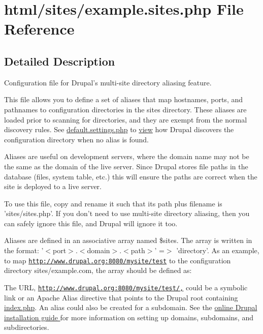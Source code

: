 \hypertarget{example_8sites_8php}{
\section{html/sites/example.sites.php File Reference}
\label{example_8sites_8php}
}


\subsection{Detailed Description}
Configuration file for Drupal's multi-\/site directory aliasing feature.

This file allows you to define a set of aliases that map hostnames, ports, and pathnames to configuration directories in the sites directory. These aliases are loaded prior to scanning for directories, and they are exempt from the normal discovery rules. See \hyperlink{default_8settings_8php}{default.settings.php} to \hyperlink{classview}{view} how Drupal discovers the configuration directory when no alias is found.

Aliases are useful on development servers, where the domain name may not be the same as the domain of the live server. Since Drupal stores file paths in the database (files, system table, etc.) this will ensure the paths are correct when the site is deployed to a live server.

To use this file, copy and rename it such that its path plus filename is 'sites/sites.php'. If you don't need to use multi-\/site directory aliasing, then you can safely ignore this file, and Drupal will ignore it too.

Aliases are defined in an associative array named \$sites. The array is written in the format: '$<$port$>$.$<$domain$>$.$<$path$>$' =$>$ 'directory'. As an example, to map \href{http://www.drupal.org:8080/mysite/test}{\tt http://www.drupal.org:8080/mysite/test} to the configuration directory sites/example.com, the array should be defined as: 
 The URL, \href{http://www.drupal.org:8080/mysite/test/,}{\tt http://www.drupal.org:8080/mysite/test/,} could be a symbolic link or an Apache Alias directive that points to the Drupal root containing \hyperlink{index_8php}{index.php}. An alias could also be created for a subdomain. See the \hyperlink{}{online Drupal installation guide } for more information on setting up domains, subdomains, and subdirectories.


